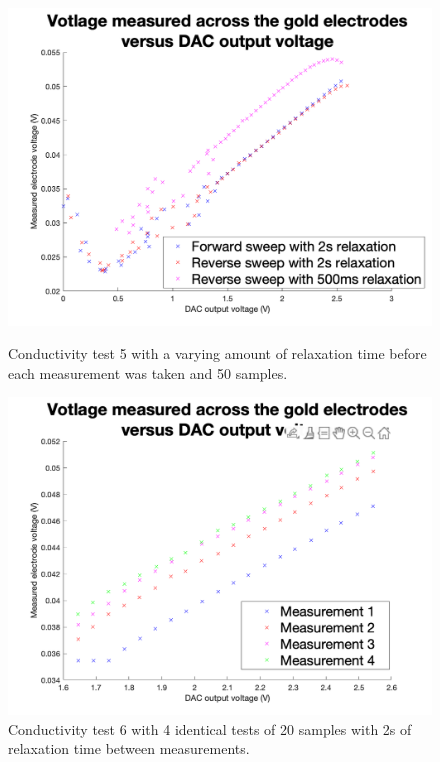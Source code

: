 \begin{figure}[ht]
    \begin{minipage}{0.5\textwidth}
        \centering
        \includegraphics[width=\textwidth]{Figures/Testing/Aus8}
        \caption{Conductivity test 5 with a varying amount of relaxation time before each measurement was taken and 50 samples.}
        \label{fig:test-test5} %
    \end{minipage}
    \begin{minipage}{0.5\textwidth}
        \centering
        \includegraphics[width=\textwidth]{Figures/Testing/Aus10}
        \caption{Conductivity test 6 with 4 identical tests of 20 samples with 2s of relaxation time between measurements.}
        \label{fig:test-test6} %
    \end{minipage}
\end{figure}



